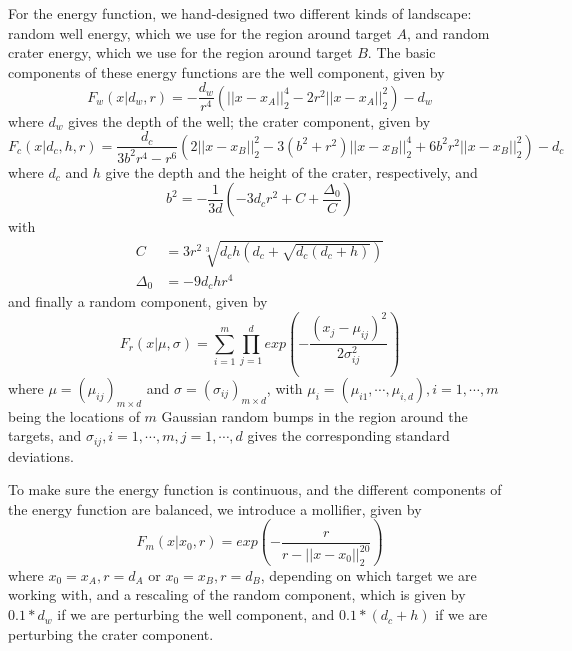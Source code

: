 \documentclass[english, aip, jcp, priprint, graphicx,floatfix]{revtex4-1}
\theoremstyle{plain}
\theoremstyle{definition}
\theoremstyle{plain}
\begin{document}
For the energy function, we hand-designed two different kinds of landscape: random well energy, which we use for the region around target $A$, and random crater energy, which we use for the region around target $B$. The basic components of these energy functions are the well component, given by
\begin{equation}
F_w(x|d_w, r) = -\frac{d_w}{r^4}(||x - x_A||_2^4 - 2r^2||x - x_A||_2^2) - d_w
\end{equation}
where $d_w$ gives the depth of the well; the crater component, given by
\begin{equation}
F_c(x|d_c, h, r) = \frac{d_c}{3b^2r^4 - r^6}(2||x - x_B||_2^2 - 3(b^2 + r^2)||x - x_B||_2^4 + 6b^2r^2||x - x_B||_2^2) - d_c
\end{equation}
where $d_c$ and $h$ give the depth and the height of the crater, respectively, and
\begin{equation}
b^2 = -\frac{1}{3d}(-3 d_c r^2 + C + \frac{\Delta_0}{C})
\end{equation}
with
\begin{align*}
C &= 3r^2 \sqrt[3]{d_c h (d_c + \sqrt{d_c (d_c + h)})} \\
\Delta_0 &= -9 d_c h r^4
\end{align*}
and finally a random component, given by
\begin{equation}
F_r(x|\mu, \sigma) = \sum_{i=1}^m\prod_{j=1}^d exp(-\frac{(x_j - \mu_{i j})^2}{2\sigma_{i j}^2})
\end{equation}
where $\mu=(\mu_{i j})_{m \times d}$ and $\sigma=(\sigma_{i j})_{m \times d}$, with $\mu_i=(\mu_{i 1}, \cdots, \mu_{i, d}), i=1, \cdots, m$ being the locations of $m$ Gaussian random bumps in the region around the targets, and $\sigma_{i j}, i=1, \cdots, m, j=1, \cdots, d$ gives the corresponding standard deviations.

To make sure the energy function is continuous, and the different components of the energy function are balanced, we introduce a mollifier, given by
\begin{equation}
F_m(x|x_0, r) = exp(-\frac{r}{r - ||x - x_0||_2^{20}})
\end{equation}
where $x_0=x_A, r=d_A$ or $x_0=x_B, r=d_B$, depending on which target we are working with, and a rescaling of the random component, which is given by $0.1 * d_w$ if we are perturbing the well component, and $0.1 * (d_c + h)$ if we are perturbing the crater component.
\end{document}
